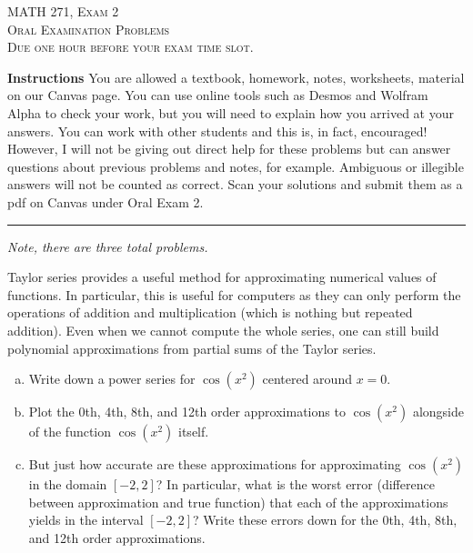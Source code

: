 \documentclass[12pt]{amsbook}
\begin{document}

\begin{center}
   \textsc{\large MATH 271, Exam 2}\\
   \textsc{Oral Examination Problems}\\
   \textsc{Due one hour before your exam time slot.}
\end{center}

\vspace{1cm}

\noindent\textbf{Instructions} \; You are allowed a textbook, homework, notes, worksheets, material on our Canvas page.  You can use online tools such as Desmos and Wolfram Alpha to check your work, but you will need to explain how you arrived at your answers.  You can work with other students and this is, in fact, encouraged! However, I will not be giving out direct help for these problems but can answer questions about previous problems and notes, for example. Ambiguous or illegible answers will not be counted as correct. Scan your solutions and submit them as a pdf on Canvas under Oral Exam 2.


\vspace{1cm}


\hrule

\vspace*{1cm}
\noindent\emph{Note, there are three total problems.}

\newpage

\begin{problem}
Taylor series provides a useful method for approximating numerical values of functions. In particular, this is useful for computers as they can only perform the operations of addition and multiplication (which is nothing but repeated addition). Even when we cannot compute the whole series, one can still build polynomial approximations from partial sums of the Taylor series.
\begin{enumerate}[(a)]
    \item Write down a power series for $\cos(x^2)$ centered around $x=0$.
    \item Plot the 0th, 4th, 8th, and 12th order approximations to $\cos(x^2)$ alongside of the function $\cos(x^2)$ itself.
    \item But just how accurate are these approximations for approximating $\cos(x^2)$ in the domain $[-2,2]$? In particular, what is the worst error (difference between approximation and true function) that each of the approximations yields in the interval $[-2,2]$? Write these errors down for the 0th, 4th, 8th, and 12th order approximations.  
\end{enumerate}
\end{problem}
\end{document}
